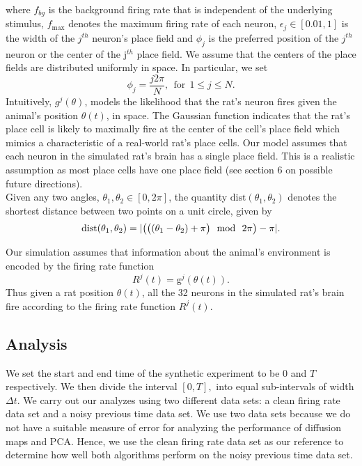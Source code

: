 where $f_{bg}$ is the background firing rate that is independent of the underlying stimulus, $f_{\max}$ denotes the maximum firing rate of each neuron, $\epsilon_j \in  [0.01, 1]$ is the width of the $j^{th}$ neuron's place field  and $\phi_{j}$ is the preferred position of the $j^{th}$  neuron or the center of the j$^{th}$ place field. We assume that the centers of the place fields are distributed uniformly in space.  In particular, we set 
$$\phi_j = \frac{j2\pi}{N}, \ \    \text{for}   \ \    1 \leq j \leq N.$$
Intuitively, $g^{j}(\theta)$, models  the likelihood that the rat's neuron fires given the animal's position $\theta(t)$, in space.
The Gaussian function indicates that the rat's place cell is  likely to  maximally fire at the center of the cell's place field
which mimics a characteristic  of a real-world rat's place cells.
Our model assumes that each neuron in the simulated rat's brain has a single place field. This is a realistic assumption as 
most place cells have one place field (see section 6 on possible future directions). \\

Given any two angles, $\theta_{1}, \theta_{2} \in [0, 2\pi]$, the quantity
$\text{dist}(\theta_{1}, \theta_{2})$ denotes the shortest distance between 
two points on a unit circle, given by
\[
\text{dist}(\theta_{1}, \theta_{2}) = \abs{\big( \big( (\theta_{1} - \theta_{2}) + \pi  \big) \ \ \text{mod} \ \ 2\pi \big) - \pi}.
\]

Our simulation assumes  that information about the animal's environment is  encoded by the firing rate function
$$R^{j}(t) =  \text{g}^{j}(\theta(t)).$$
Thus given a rat position $\theta(t)$, all the 32  neurons  in the simulated rat's brain fire according to the firing rate function  $R^{j}(t).$


\subsection{Analysis}
We set the start  and end time of the synthetic experiment  to be  $0$ and $T$ respectively. We then divide the interval
$[0, T],$ into equal sub-intervals  of width $\Delta t$.
We carry out  our analyzes  using two different data sets:  a clean firing rate data set and  a noisy previous time data set.
We use two data sets because we do not have a suitable measure of error for analyzing the performance of diffusion maps
and PCA. Hence, we use the clean firing rate data set as our reference to determine how well both algorithms perform
on the noisy previous time data set.\\

